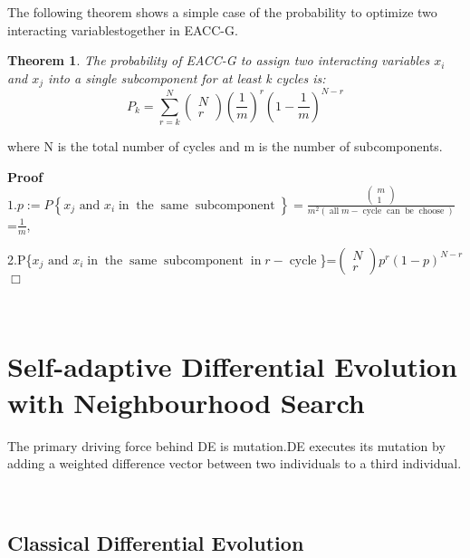 \documentclass{article}
\newcommand{\assign}{:=}
\newcommand{\infixand}{\text{ and }}
\newcommand{\tmop}[1]{\ensuremath{\operatorname{#1}}}
\newenvironment{proof}{\noindent\textbf{Proof\ }}{\hspace*{\fill}$\Box$\medskip}
\newtheorem{theorem}{Theorem}
\begin{document}
The following theorem shows a simple case of the probability to optimize two
interacting variablestogether in EACC-G.

\begin{theorem}
  The probability of EACC-G to assign two interacting variables $x_i$ and
  $x_j$ into a single subcomponent for at least k cycles is:
  \begin{equation}
    P_k = \underset{r = k}{\sum^N} \left( \begin{array}{c}
      N\\
      r
    \end{array} \right) \left( \frac{1}{m} \right)^r \left( 1 - \frac{1}{m}
    \right)^{N - r}
  \end{equation}
\end{theorem}

where N is the total number of cycles and m is the number of subcomponents.

\begin{proof}
  $1. p \assign P \left\{ x_j \infixand x_i \tmop{in} \tmop{the} \tmop{same}
  \tmop{subcomponent} \right\} = \frac{\left( \begin{array}{c}
    m\\
    1
  \end{array} \right)}{m^2 (\tmop{all} m - \tmop{cycle} \tmop{can} \tmop{be}
  \tmop{choose})}$=$\frac{1}{m}$,
  
  2.P\{$x_j \infixand x_i \tmop{in} \tmop{the} \tmop{same} \tmop{subcomponent}
  \tmop{in} r - \tmop{cycle}$\}=$\left( \begin{array}{c}
    N\\
    r
  \end{array} \right) p^r (1 - p)^{N - r}$
\end{proof}

\

\section{Self-adaptive Differential Evolution with Neighbourhood Search}

The primary driving force behind DE is mutation.DE executes its mutation by
adding a weighted difference vector between two individuals to a third
individual.

\

\subsection{Classical Differential Evolution}
\end{document}
